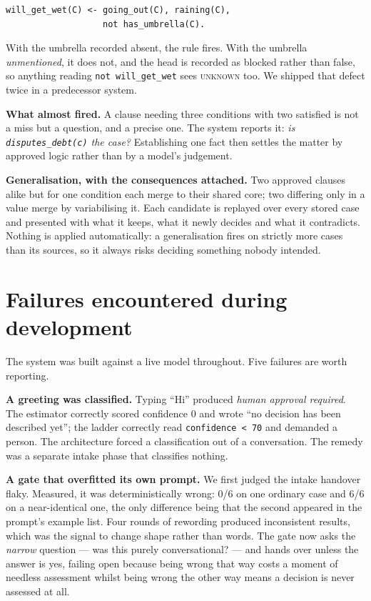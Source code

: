 \documentclass[sigconf,nonacm]{acmart}
\begin{document}
\begin{lstlisting}
will_get_wet(C) <- going_out(C), raining(C),
                   not has_umbrella(C).
\end{lstlisting}

\noindent With the umbrella recorded absent, the rule fires. With the umbrella
\emph{unmentioned}, it does not, and the head is recorded as blocked rather than
false, so anything reading \texttt{not will\_get\_wet} sees \textsc{unknown} too.
We shipped that defect twice in a predecessor system.

\textbf{What almost fired.} A clause needing three conditions with two satisfied
is not a miss but a question, and a precise one. The system reports it: \emph{is
\texttt{disputes\_debt(c)} the case?} Establishing one fact then settles the
matter by approved logic rather than by a model's judgement.

\textbf{Generalisation, with the consequences attached.} Two approved clauses
alike but for one condition each merge to their shared core; two differing only
in a value merge by variabilising it. Each candidate is replayed over every
stored case and presented with what it keeps, what it newly decides and what it
contradicts. Nothing is applied automatically: a generalisation fires on
strictly more cases than its sources, so it always risks deciding something
nobody intended.

\section{Failures encountered during development}

The system was built against a live model throughout. Five failures are worth
reporting.

\textbf{A greeting was classified.} Typing ``Hi'' produced \emph{human approval
required}. The estimator correctly scored confidence 0 and wrote ``no decision
has been described yet''; the ladder correctly read \texttt{confidence < 70} and
demanded a person. The architecture forced a classification out of a
conversation. The remedy was a separate intake phase that classifies nothing.

\textbf{A gate that overfitted its own prompt.} We first judged the intake
handover flaky. Measured, it was deterministically wrong: 0/6 on one ordinary
case and 6/6 on a near-identical one, the only difference being that the second
appeared in the prompt's example list. Four rounds of rewording produced
inconsistent results, which was the signal to change shape rather than words.
The gate now asks the \emph{narrow} question --- was this purely
conversational? --- and hands over unless the answer is yes, failing open
because being wrong that way costs a moment of needless assessment whilst being
wrong the other way means a decision is never assessed at all.
\end{document}

